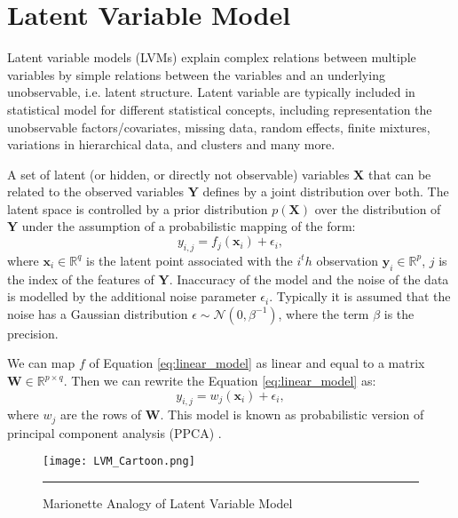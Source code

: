 \section{Latent Variable Model}
Latent variable models (LVMs) \cite{Bishop:1999} explain complex relations between multiple variables by simple relations between the variables and an underlying unobservable, i.e. latent structure.
Latent variable are typically included in statistical model for different statistical concepts, including representation the unobservable factors/covariates, missing data, random effects, finite 
mixtures, variations in hierarchical data, and clusters and many more.

A set of latent (or hidden, or directly not observable) variables $\textbf{X}$ that can be related to the observed variables $\textbf{Y}$ defines by a joint distribution over both. The latent space is 
controlled by a prior distribution $p\left(\textbf{X}\right)$ over the distribution of $\textbf{Y}$ under the assumption of a probabilistic mapping of the form:
\begin{equation} \label{eq:linear_model}
y_{i,j} = f_j\left(\textbf{x}_{i}\right) + \epsilon_{i},
\end{equation}
where $\textbf{x}_i \in \mathbb{R}^q$ is the latent point associated with the $i^th$ observation $\textbf{y}_i \in \mathbb{R}^p$, $j$ is the index of the features of $\textbf{Y}$. Inaccuracy of
the model  and the noise of the data is modelled by the additional noise parameter $\epsilon_{i}$. Typically it is assumed that the noise has a Gaussian distribution $\epsilon \sim \mathcal{N} \left(0,\beta^{-1}\right)$, where the term $\beta$ is the precision.

We can map $f$ of Equation \ref{eq:linear_model} as linear and equal to a matrix $\textbf{W}\in\mathbb{R}^{p\times q}$. Then we can rewrite the Equation \ref{eq:linear_model} as:
\begin{equation} \label{eq:linear_model_matrix}
y_{i,j} = w_j\left(\textbf{x}_{i}\right) + \epsilon_{i},
\end{equation}
where $w_j$ are the rows of $\textbf{W}$. This model is known as probabilistic version of principal component analysis (PPCA) \cite{Roweis:1998, Tipping:1999}. 

\begin{figure}
	\centering
		\texttt{[image: LVM\_Cartoon.png]}
		\rule{35em}{0.5pt}
	\caption[Marionette Analogy of Latent Variable Model]
		{Marionette Analogy of Latent Variable Model}
	\label{fig:LVM Cartton}
\end{figure}

